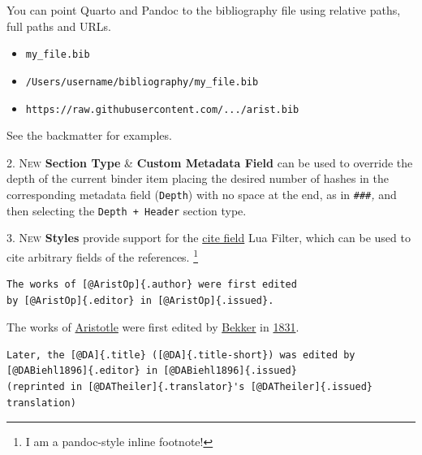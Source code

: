 \documentclass[
  12pt,
  a4paper,
  oneside]{scrbook}
\providecommand{\tightlist}{%
  \setlength{\itemsep}{0pt}\setlength{\parskip}{0pt}}\usepackage{longtable,booktabs,array}
\begin{document}
\begin{tcolorbox}[enhanced jigsaw, coltitle=black, breakable, opacityback=0, bottomrule=.15mm, colbacktitle=quarto-callout-important-color!10!white, colback=white, arc=.35mm, title=\textcolor{quarto-callout-important-color}{\faExclamation}\hspace{0.5em}{Important}, bottomtitle=1mm, colframe=quarto-callout-important-color-frame, left=2mm, leftrule=.75mm, rightrule=.15mm, titlerule=0mm, toptitle=1mm, toprule=.15mm, opacitybacktitle=0.6]

You can point Quarto and Pandoc to the bibliography file using relative
paths, full paths and URLs.

\begin{itemize}
\tightlist
\item
  \texttt{my\_file.bib}
\item
  \texttt{/Users/username/bibliography/my\_file.bib}
\item
  \texttt{https://raw.githubusercontent.com/.../arist.bib}
\end{itemize}

\end{tcolorbox}

See the backmatter for examples.

\textsc{2. New} \textbf{Section Type} \& \textbf{Custom Metadata Field}
can be used to override the depth of the current binder item placing the
desired number of hashes in the corresponding metadata field
(\texttt{Depth}) with no space at the end, as in \texttt{\#\#\#}\emph{,}
and then selecting the \texttt{Depth\ +\ Header} section type.

\textsc{3. New} \textbf{Styles} provide support for the
\href{https://github.com/bcdavasconcelos/citefield}{cite field} Lua
Filter, which can be used to cite arbitrary fields of the references.
\footnote{I am a pandoc-style inline footnote!}

\begin{verbatim}
The works of [@AristOp]{.author} were first edited 
by [@AristOp]{.editor} in [@AristOp]{.issued}.  
\end{verbatim}

The works of
\protect\hypertarget{cite_37}{}{\label{cite_37}\protect\hyperlink{ref-AristOp}{Aristotle}}
were first edited by
\protect\hypertarget{cite_38}{}{\label{cite_38}\protect\hyperlink{ref-AristOp}{Bekker}}
in
\protect\hypertarget{cite_39}{}{\label{cite_39}\protect\hyperlink{ref-AristOp}{1831}}.

\begin{verbatim}
Later, the [@DA]{.title} ([@DA]{.title-short}) was edited by 
[@DABiehl1896]{.editor} in [@DABiehl1896]{.issued} 
(reprinted in [@DATheiler]{.translator}'s [@DATheiler]{.issued} translation)
\end{verbatim}
\end{document}
